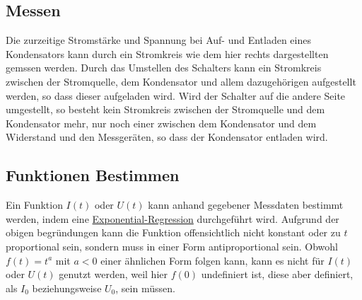 \documentclass{article}
\begin{document}
\subsection{Messen}
\begin{minipage}{\dimexpr\linewidth-4cm}
Die zurzeitige Stromstärke und Spannung bei Auf- und Entladen eines Kondensators kann durch ein Stromkreis wie dem hier rechts dargestellten gemssen werden. \newline
Durch das Umstellen des Schalters kann ein Stromkreis zwischen der Stromquelle, dem Kondensator und allem dazugehörigen aufgestellt werden, so dass dieser aufgeladen wird. Wird der Schalter auf die andere Seite umgestellt, so besteht kein Stromkreis zwischen der Stromquelle und dem Kondensator mehr, nur noch einer zwischen dem Kondensator und dem Widerstand und den Messgeräten, so dass der Kondensator entladen wird. 
\end{minipage}
\hfill
\begin{minipage}{4cm}
 \center
\end{minipage}  
 
\subsection{Funktionen Bestimmen}
Ein Funktion $I(t)$ oder $U(t)$ kann anhand gegebener Messdaten bestimmt werden, indem eine \hyperref[Umgang mit dem Taschenrechner in Physik]{Exponential-Regression} durchgeführt wird. Aufgrund der obigen begründungen kann die Funktion offensichtlich nicht konstant oder zu $t$ proportional sein, sondern muss in einer Form antiproportional sein. Obwohl $f(t)=t^a$ mit $a < 0$ einer ähnlichen Form folgen kann, kann es nicht für $I(t)$ oder $U(t)$ genutzt werden, weil hier $f(0)$ undefiniert ist, diese aber definiert, als $I_0$ beziehungsweise $U_0$, sein müssen.
 
\end{document}
